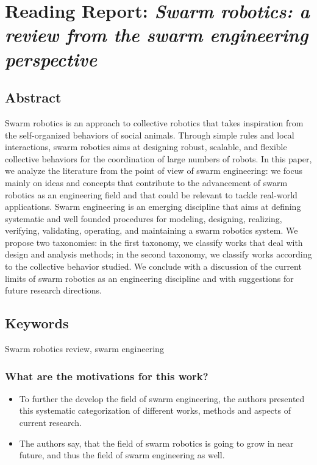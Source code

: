     
    \newpage
    \section{Reading Report: \emph{Swarm robotics: a review from the swarm engineering perspective}}
    \label{sec:Brambilla2013}
    \cite{Brambilla2013}
    
    \subsection*{Abstract}
    Swarm robotics is an approach to collective robotics that takes inspiration from
    the self-organized behaviors of social animals. Through simple rules and local interactions,
    swarm robotics aims at designing robust, scalable, and flexible collective behaviors for the
    coordination of large numbers of robots. In this paper, we analyze the literature from the
    point of view of swarm engineering: we focus mainly on ideas and concepts that contribute
    to the advancement of swarm robotics as an engineering field and that could be relevant
    to tackle real-world applications. Swarm engineering is an emerging discipline that aims at
    defining systematic and well founded procedures for modeling, designing, realizing, verifying, validating, operating, and maintaining a swarm robotics system. We propose two
    taxonomies: in the first taxonomy, we classify works that deal with design and analysis
    methods; in the second taxonomy, we classify works according to the collective behavior
    studied. We conclude with a discussion of the current limits of swarm robotics as an engineering discipline and with suggestions for future research directions.
    
    \subsection*{Keywords}
    Swarm robotics review, swarm engineering
    
    
     
    \subsubsection*{What are the motivations for this work?}
    \begin{itemize}
        \item To further the develop the field of swarm engineering, the authors presented this systematic categorization of different works, methods and aspects of current research.
        \item The authors say, that the field of swarm robotics is going to grow in near future, and thus the field of swarm engineering as well.
    \end{itemize}
